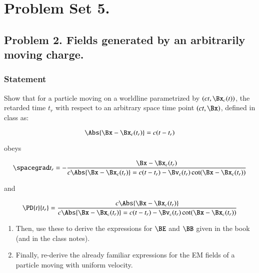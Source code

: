 %
%

\chapter{Problem Set 5.}
\label{chap:relElectroDynProblemSet5}
\date{Mar 14, 2011}

\beginArtWithToc



\section{Problem 2.  Fields generated by an arbitrarily moving charge.}

\subsection{Statement}

Show that for a particle moving on a worldline parametrized by $(ct, \Bx_c(t))$, the retarded time $t_r$ with respect to an arbitrary space time point $(ct, \Bx)$, defined in class as:

\begin{equation}\label{eqn:relElectroDynProblemSet5:10}
\Abs{\Bx - \Bx_c(t_r)} = c(t - t_r)
\end{equation}

obeys 

\begin{equation}\label{eqn:relElectroDynProblemSet5:30}
\spacegrad t_r = -\frac{\Bx - \Bx_c(t_r)}{
c \Abs{\Bx - \Bx_c(t_r)} = c(t - t_r) - \Bv_c(t_r) \cot (\Bx - \Bx_c(t_r))
}
\end{equation}

and

\begin{equation}\label{eqn:relElectroDynProblemSet5:50}
\PD{t}{t_r} = \frac{c \Abs{\Bx - \Bx_c(t_r)}}{
c \Abs{\Bx - \Bx_c(t_r)} = c(t - t_r) - \Bv_c(t_r) \cot (\Bx - \Bx_c(t_r))
}
\end{equation}

\begin{enumerate}
\item Then, use these to derive the expressions for $\BE$ and $\BB$ given in the book (and in the class notes).
\item Finally, re-derive the already familiar expressions for the EM fields of a particle moving with uniform velocity.
\end{enumerate}

